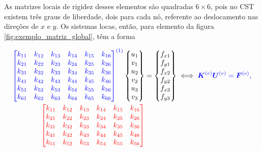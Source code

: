 As matrizes locais de rigidez desses elementos são quadradas $6 \times 6$, pois no CST existem três graus de liberdade, dois para cada nó, referente ao deslocamento nas direções de $x$ e $y$. Os sistemas locas, então, para elemento da figura \ref{fig:exemplo_matriz_global}, têm a forma

\begin{align}
    \color{blue} \begin{bmatrix}
        k_{11} & k_{12} & k_{13} & k_{14} & k_{15} & k_{16} \\
        k_{21} & k_{22} & k_{23} & k_{24} & k_{25} & k_{26} \\
        k_{31} & k_{32} & k_{33} & k_{34} & k_{35} & k_{36} \\
        k_{41} & k_{42} & k_{43} & k_{44} & k_{45} & k_{46} \\
        k_{51} & k_{52} & k_{53} & k_{54} & k_{55} & k_{56} \\
        k_{61} & k_{62} & k_{63} & k_{64} & k_{65} & k_{66} \\
    \end{bmatrix}^{(1)}
    \color{black}
    \begin{Bmatrix}
        u_1 \\ v_1 \\ u_2 \\ v_2 \\ u_3 \\ v_3
    \end{Bmatrix}
    &=
    \begin{Bmatrix}
        f_{x1} \\ f_{y1} \\ f_{x2} \\ f_{y2} \\ f_{x3} \\ f_{y3}
    \end{Bmatrix} \iff \color{blue} \bm{K}^{(e)} \bm{U}^{(e)} = \bm{F}^{(e)}, \\
    \color{red} \begin{bmatrix}
        k_{11} & k_{12} & k_{13} & k_{14} & k_{15} & k_{16} \\
        k_{21} & k_{22} & k_{23} & k_{24} & k_{25} & k_{26} \\
        k_{31} & k_{32} & k_{33} & k_{34} & k_{35} & k_{36} \\
        k_{41} & k_{42} & k_{43} & k_{44} & k_{45} & k_{46} \\
        k_{51} & k_{52} & k_{53} & k_{54} & k_{55} & k_{56} \\

\end{bmatrix}
\end{align}
